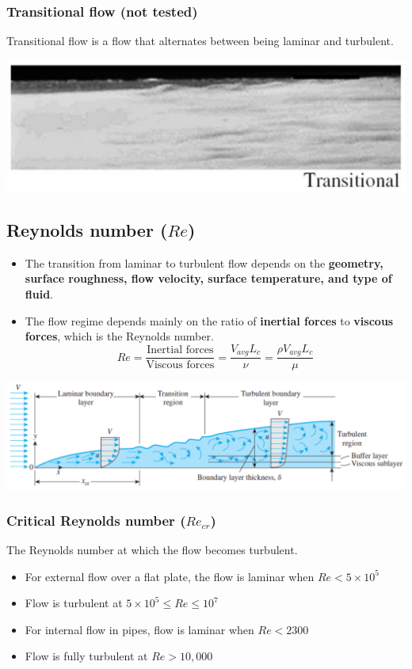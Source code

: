 \documentclass[11pt]{article}
\begin{document}
\subsubsection{Transitional flow (not tested)}
\label{sec:org942ee12}
Transitional flow is a flow that alternates between being laminar and turbulent.
\begin{center}
\includegraphics[width=.9\linewidth]{./images/transitional-flow-photo.png}
\end{center}

\subsection{Reynolds number (\(Re\))}
\label{sec:orgb9e1ef7}
\begin{itemize}
\item The transition from laminar to turbulent flow depends on the \textbf{geometry, surface roughness, flow velocity, surface temperature, and type of fluid}.
\item The flow regime depends mainly on the ratio of \textbf{inertial forces} to \textbf{viscous forces}, which is the Reynolds number.
\[Re = \frac{\text{Inertial forces}}{\text{Viscous forces}} = \frac{V_{avg} L_c}{\nu} = \frac{\rho V_{avg} L_c}{\mu}\]
\end{itemize}

\begin{center}
\includegraphics[width=.9\linewidth]{./images/reynolds-number-diagram.png}
\end{center}

\subsubsection{Critical Reynolds number (\(Re_{cr}\))}
\label{sec:orga47b0ce}
The Reynolds number at which the flow becomes turbulent.
\begin{itemize}
\item For external flow over a flat plate, the flow is laminar when \(Re < 5 \times 10^5\)
\item Flow is turbulent at \(5 \times 10^5 \le Re \le 10^7\)
\item For internal flow in pipes, flow is laminar when \(Re < 2300\)
\item Flow is fully turbulent at \(Re > 10,000\)
\end{itemize}
\end{document}

